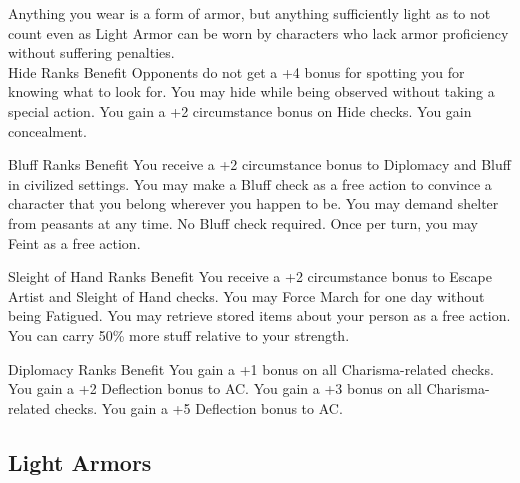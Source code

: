 \begin{multicols}{2}
Anything you wear is a form of armor, but anything sufficiently light as to not count even as Light Armor can be worn by characters who lack armor proficiency without suffering penalties.\\




{Hide Ranks Benefit
}{Opponents do not get a +4 bonus for spotting you for knowing what to look for.
}{You may hide while being observed without taking a special action.
}{You gain a +2 circumstance bonus on Hide checks.
}{You gain concealment.
}


{Bluff Ranks Benefit}
{You receive a +2 circumstance bonus to Diplomacy and Bluff in civilized settings.}
{You may make a Bluff check as a free action to convince a character that you belong wherever you happen to be.}
{You may demand shelter from peasants at any time. No Bluff check required.}
{Once per turn, you may Feint as a free action.}



{Sleight of Hand Ranks Benefit}
{You receive a +2 circumstance bonus to Escape Artist and Sleight of Hand checks.}
{You may Force March for one day without being Fatigued.}
{You may retrieve stored items about your person as a free action.}
{You can carry 50\% more stuff relative to your strength.}



{Diplomacy Ranks Benefit}
{You gain a +1 bonus on all Charisma-related checks.}
{You gain a +2 Deflection bonus to AC.}
{You gain a +3 bonus on all Charisma-related checks.}
{You gain a +5 Deflection bonus to AC.}


\vspace{20pt}
\subsection{Light Armors}




\end{multicols}
